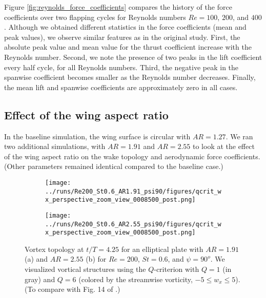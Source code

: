 Figure \ref{fig:reynolds_force_coefficients} compares the history of the force coefficients over two flapping cycles for Reynolds numbers $Re = 100$, $200$, and $400$.
Although we obtained different statistics in the force coefficients (mean and peak values), we observe similar features as in the original study.
First, the absolute peak value and mean value for the thrust coefficient increase with the Reynolds number.
Second, we note the presence of two peaks in the lift coefficient every half cycle, for all Reynolds numbers.
Third, the negative peak in the spanwise coefficient becomes smaller as the Reynolds number decreases.
Finally, the mean lift and spanwise coefficients are approximately zero in all cases.

\subsection{Effect of the wing aspect ratio}

In the baseline simulation, the wing surface is circular with $AR = 1.27$.
We ran two additional simulations, with $AR = 1.91$ and $AR = 2.55$ to look at the effect of the wing aspect ratio on the wake topology and aerodynamic force coefficients.
(Other parameters remained identical compared to the baseline case.)

\begin{figure}
  \centering
  \begin{subfigure}[c]{0.45\textwidth}
    \centering
    \texttt{[image: ../runs/Re200\_St0.6\_AR1.91\_psi90/figures/qcrit\_wx\_perspective\_zoom\_view\_0008500\_post.png]}
    \caption{}
  \end{subfigure}
  \hfill
  \begin{subfigure}[c]{0.45\textwidth}
    \centering
    \texttt{[image: ../runs/Re200\_St0.6\_AR2.55\_psi90/figures/qcrit\_wx\_perspective\_zoom\_view\_0008500\_post.png]}
    \caption{}
  \end{subfigure}
  \caption{Vortex topology at $t / T = 4.25$ for an elliptical plate with $AR = 1.91$ (a) and $AR = 2.55$ (b) for $Re = 200$, $St = 0.6$, and $\psi = 90^o$. We visualized vortical structures using the $Q$-criterion with $Q = 1$ (in gray) and $Q = 6$ (colored by the streamwise vorticity, $-5 \leq w_x \leq 5$). (To compare with Fig. 14 of \citet{li_dong_2016}.)}
  \label{fig:ratio_wake_topology}
\end{figure}

